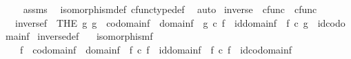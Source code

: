 \begin{isabellebody}
%
\isadelimproof
\ \ %
\endisadelimproof
%
\isatagproof
{}\isamarkupfalse%
\ assms\ \isamarkupfalse%
\ isomorphism{\isacharunderscore}{\kern0pt}def{}\ cfunc{\isacharunderscore}{\kern0pt}type{\isacharunderscore}{\kern0pt}def\ \isamarkupfalse%
\ auto%
\endisatagproof
{\isafoldproof}%
%
\isadelimproof
\isanewline
%
\endisadelimproof
\isanewline
{}\isamarkupfalse%
\ inverse\ {\isacharcolon}{\kern0pt}{\isacharcolon}{\kern0pt}\ {\isachardoublequoteopen}cfunc\ {\isasymRightarrow}\ cfunc{\isachardoublequoteclose}\ {\isacharparenleft}{\kern0pt}{\isachardoublequoteopen}{\isacharunderscore}{\kern0pt}\isactrlbold {\isasyminverse}{\isachardoublequoteclose}\ {\isacharbrackleft}{\kern0pt}{}{}{}{}{\isacharbrackright}{\kern0pt}\ {}{}{}{\isacharparenright}{\kern0pt}\ \isanewline
\ \ {\isachardoublequoteopen}inverse{\isacharparenleft}{\kern0pt}f{\isacharparenright}{\kern0pt}\ {\isacharequal}{\kern0pt}\ {\isacharparenleft}{\kern0pt}THE\ g{\isachardot}{\kern0pt}\ g\ {\isacharcolon}{\kern0pt}\ codomain{\isacharparenleft}{\kern0pt}f{\isacharparenright}{\kern0pt}\ {\isasymrightarrow}\ domain{\isacharparenleft}{\kern0pt}f{\isacharparenright}{\kern0pt}\ {\isasymand}\ g\ {\isasymcirc}\isactrlsub c\ f\ {\isacharequal}{\kern0pt}\ id{\isacharparenleft}{\kern0pt}domain{\isacharparenleft}{\kern0pt}f{\isacharparenright}{\kern0pt}{\isacharparenright}{\kern0pt}\ {\isasymand}\ f\ {\isasymcirc}\isactrlsub c\ g\ {\isacharequal}{\kern0pt}\ id{\isacharparenleft}{\kern0pt}codomain{\isacharparenleft}{\kern0pt}f{\isacharparenright}{\kern0pt}{\isacharparenright}{\kern0pt}{\isacharparenright}{\kern0pt}{\isachardoublequoteclose}\isanewline
\isanewline
{}\isamarkupfalse%
\ inverse{\isacharunderscore}{\kern0pt}def{}{\isacharcolon}{\kern0pt}\isanewline
\ \ \ {\isachardoublequoteopen}isomorphism{\isacharparenleft}{\kern0pt}f{\isacharparenright}{\kern0pt}{\isachardoublequoteclose}\isanewline
\ \ \ {\isachardoublequoteopen}f\isactrlbold {\isasyminverse}\ {\isacharcolon}{\kern0pt}\ codomain{\isacharparenleft}{\kern0pt}f{\isacharparenright}{\kern0pt}\ {\isasymrightarrow}\ domain{\isacharparenleft}{\kern0pt}f{\isacharparenright}{\kern0pt}\ {\isasymand}\ f\isactrlbold {\isasyminverse}\ {\isasymcirc}\isactrlsub c\ f\ {\isacharequal}{\kern0pt}\ id{\isacharparenleft}{\kern0pt}domain{\isacharparenleft}{\kern0pt}f{\isacharparenright}{\kern0pt}{\isacharparenright}{\kern0pt}\ {\isasymand}\ f\ {\isasymcirc}\isactrlsub c\ f\isactrlbold {\isasyminverse}\ {\isacharequal}{\kern0pt}\ id{\isacharparenleft}{\kern0pt}codomain{\isacharparenleft}{\kern0pt}f{\isacharparenright}{\kern0pt}{\isacharparenright}{\kern0pt}{\isachardoublequoteclose}\isanewline

\end{isabellebody}
